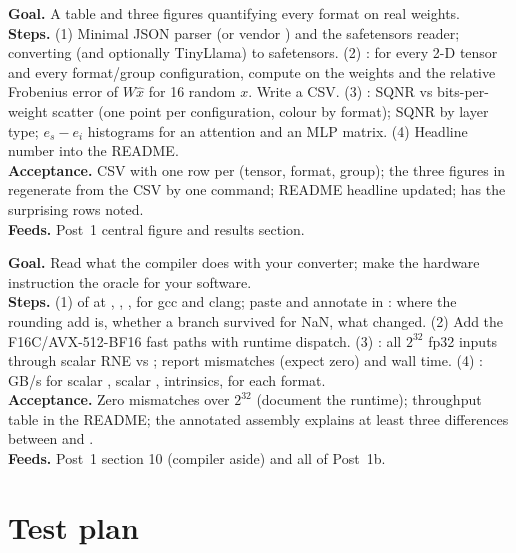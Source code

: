 \textbf{Goal.} A table and three figures quantifying every format on real weights.\\
\textbf{Steps.} (1) Minimal JSON parser (or vendor ) and the safetensors reader;  converting  (and optionally TinyLlama) to safetensors. (2) : for every 2-D tensor and every format/group configuration, compute  on the weights and the relative Frobenius error of $W\hat{x}$ for 16 random $x$. Write a CSV. (3) : SQNR vs bits-per-weight scatter (one point per configuration, colour by format); SQNR by layer type; $e_s - e_i$ histograms for an attention and an MLP matrix. (4) Headline number into the README.\\
\textbf{Acceptance.} CSV with one row per (tensor, format, group); the three figures in  regenerate from the CSV by one command; README headline updated;  has the surprising rows noted.\\
\textbf{Feeds.} Post~1 central figure and results section.

\textbf{Goal.} Read what the compiler does with your converter; make the hardware instruction the oracle for your software.\\
\textbf{Steps.} (1)  of  at , , , for gcc and clang; paste and annotate in : where the rounding add is, whether a branch survived for NaN, what  changed. (2) Add the F16C/AVX-512-BF16 fast paths with runtime dispatch. (3) : all $2^{32}$ fp32 inputs through scalar RNE vs ; report mismatches (expect zero) and wall time. (4) : GB/s for scalar , scalar , intrinsics, for each format.\\
\textbf{Acceptance.} Zero mismatches over $2^{32}$ (document the runtime); throughput table in the README; the annotated assembly explains at least three differences between  and .\\
\textbf{Feeds.} Post~1 section 10 (compiler aside) and all of Post~1b.

\section{Test plan}

